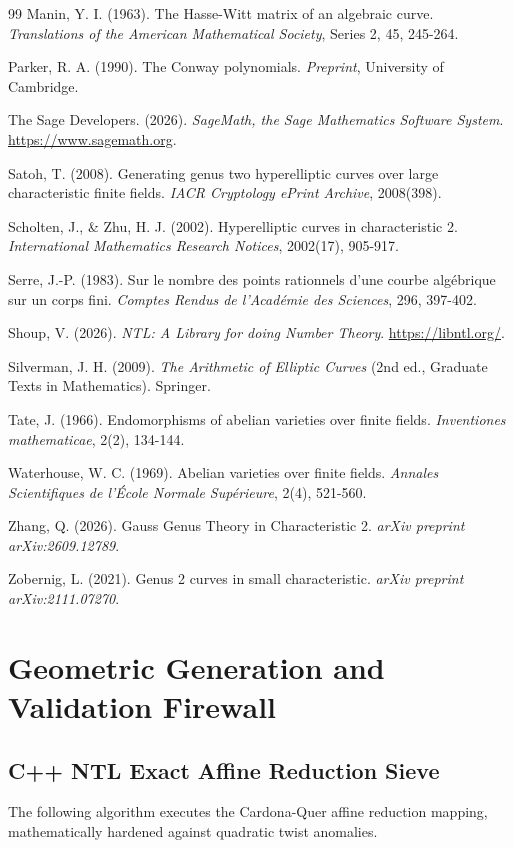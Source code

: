 \documentclass[11pt,letterpaper]{article}
\begin{document}
\begin{thebibliography}{99}
Manin, Y. I. (1963). The Hasse-Witt matrix of an algebraic curve. \textit{Translations of the American Mathematical Society}, Series 2, 45, 245-264.

Parker, R. A. (1990). The Conway polynomials. \textit{Preprint}, University of Cambridge.

The Sage Developers. (2026). \textit{SageMath, the Sage Mathematics Software System}. \url{https://www.sagemath.org}.

Satoh, T. (2008). Generating genus two hyperelliptic curves over large characteristic finite fields. \textit{IACR Cryptology ePrint Archive}, 2008(398).

Scholten, J., \& Zhu, H. J. (2002). Hyperelliptic curves in characteristic 2. \textit{International Mathematics Research Notices}, 2002(17), 905-917.

Serre, J.-P. (1983). Sur le nombre des points rationnels d'une courbe algébrique sur un corps fini. \textit{Comptes Rendus de l'Académie des Sciences}, 296, 397-402.

Shoup, V. (2026). \textit{NTL: A Library for doing Number Theory}. \url{https://libntl.org/}.

Silverman, J. H. (2009). \textit{The Arithmetic of Elliptic Curves} (2nd ed., Graduate Texts in Mathematics). Springer.

Tate, J. (1966). Endomorphisms of abelian varieties over finite fields. \textit{Inventiones mathematicae}, 2(2), 134-144.

Waterhouse, W. C. (1969). Abelian varieties over finite fields. \textit{Annales Scientifiques de l'\'{E}cole Normale Sup\'{e}rieure}, 2(4), 521-560.

Zhang, Q. (2026). Gauss Genus Theory in Characteristic 2. \textit{arXiv preprint arXiv:2609.12789}.

Zobernig, L. (2021). Genus 2 curves in small characteristic. \textit{arXiv preprint arXiv:2111.07270}.

\end{thebibliography}

\appendix
\section{Geometric Generation and Validation Firewall}
\subsection{C++ NTL Exact Affine Reduction Sieve}
The following algorithm executes the Cardona-Quer affine reduction mapping, mathematically hardened against quadratic twist anomalies.
\end{document}
